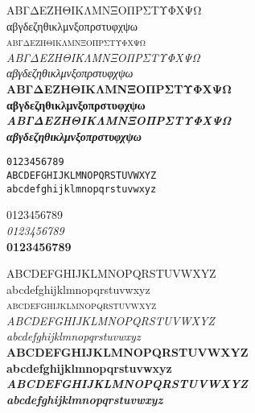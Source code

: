 \documentclass[10pt]{lecturenotes}
\begin{document}
\begin{sloppypar}
\begin{figure}[ht]
\begin{minipage}[b]{0.45\linewidth}
\noindent
ΑΒΓΔΕΖΗΘΙΚΛΜΝΞΟΠΡΣΤΥΦΧΨΩ\\
αβγδεζηθικλμνξοπρστυφχψω\\
\textsc{αβγδεζηθικλμνξοπρστυφχψω}\\
\textit{ΑΒΓΔΕΖΗΘΙΚΛΜΝΞΟΠΡΣΤΥΦΧΨΩ\\
αβγδεζηθικλμνξοπρστυφχψω \\}
\textbf{ΑΒΓΔΕΖΗΘΙΚΛΜΝΞΟΠΡΣΤΥΦΧΨΩ\\
αβγδεζηθικλμνξοπρστυφχψω}\\
\textbf{\textit{ΑΒΓΔΕΖΗΘΙΚΛΜΝΞΟΠΡΣΤΥΦΧΨΩ\\
αβγδεζηθικλμνξοπρστυφχψω}}\\


\end{minipage}
\hspace{0.5cm}
\begin{minipage}[b]{0.45\linewidth}

\noindent
\texttt{0123456789}\\


\noindent\texttt{ABCDEFGHIJKLMNOPQRSTUVWXYZ\\
abcdefghijklmnopqrstuvwxyz\\
}

\noindent
\textsf{%
0123456789\\
\textit{0123456789}\\
\textbf{0123456789}\\
}

\noindent
\textsf{%
ABCDEFGHIJKLMNOPQRSTUVWXYZ\\
abcdefghijklmnopqrstuvwxyz\\
\textsc{abcdefghijklmnopqrstuvwxyz}\\
\textit{ABCDEFGHIJKLMNOPQRSTUVWXYZ\\
abcdefghijklmnopqrstuvwxyz}\\
\textbf{ABCDEFGHIJKLMNOPQRSTUVWXYZ\\
abcdefghijklmnopqrstuvwxyz}\\
\textbf{\textit{ABCDEFGHIJKLMNOPQRSTUVWXYZ\\
abcdefghijklmnopqrstuvwxyz}}\\
}


\end{minipage}
\end{figure}
\end{sloppypar}
\end{document}
